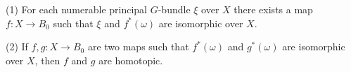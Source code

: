 (1) For each numerable principal $G$-bundle $\xi$ over $X$ there exists a map $f: X \to B_0$ such that $\xi$ and $f^*(\omega)$ are isomorphic over $X$.

(2) If $f, g: X \to B_0$ are two maps such that $f^*(\omega)$ and $g^*(\omega)$ are isomorphic over $X$, then $f$ and $g$ are homotopic.

